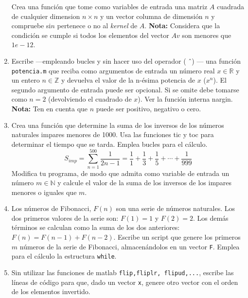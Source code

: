 \begin{enumerate}
Crea una función que tome como variables de entrada una matriz $A$ cuadrada de cualquier dimension $n\times n$ y un vector columna de dimensión $n$ y compruebe si$n$ pertenece o no al \emph{kernel} de $A$. \textbf{Nota:} Considera que la condición se cumple si todos los elementos del vector $Av$ son menores que $1e-12$.

\item Escribe ---empleando bucles y sin hacer uso del operador ( \^\ ) --- una función \verb|potencia.m| que reciba como argumentos de entrada un número real $x\in \mathbb{R}$ y un entero $n \in \mathbb{Z}$ y devuelva el valor de la n-ésima potencia de $x$ ($x^n$). El segundo argumento de entrada puede ser opcional. Si se omite debe tomarse como $n=2$ (devolviendo el cuadrado de $x$). Ver la función interna nargin. \textbf{Nota:} Ten en cuenta que $n$ puede ser positivo, negativo o cero.

\item Crea una función que determine la suma de los inversos de los números naturales impares menores de 1000. Usa las funciones tic y toc para determinar el tiempo que se tarda. Emplea bucles para el cálculo.
\begin{equation*}
S_{imp} = \sum_{n=1}^{500}\frac{1}{2n-1} =\frac{1}{1}+\frac{1}{3}+\frac{1}{5}+\cdots+\frac{1}{999}
\end{equation*}
Modifica tu programa, de modo que admita como variable de entrada un número $m\in\mathbb{N}$ y calcule el valor de la suma de los inversos de los impares menores o iguales que $m$.

\item Los números de Fibonacci, $F(n)$ son una serie de números naturales. Los dos primeros valores de la serie son:  $F(1)=1$ y $F(2)=2$. Los demás términos se calculan como la suma de los dos anteriores: $F(n) = F(n-1) + F(n-2)$.
Escribe un script que genere los primeros $m$ números de la serie de Fibonacci, almacenándolos en un vector \verb|F|. Emplea para el cálculo la estructura \verb|while|.

\item Sin utilizar las funciones de matlab \verb|flip,fliplr, flipud,...|, escribe las líneas de código para que, dado un vector \verb|x|, genere otro vector con el orden de los elementos invertido.
\end{enumerate}